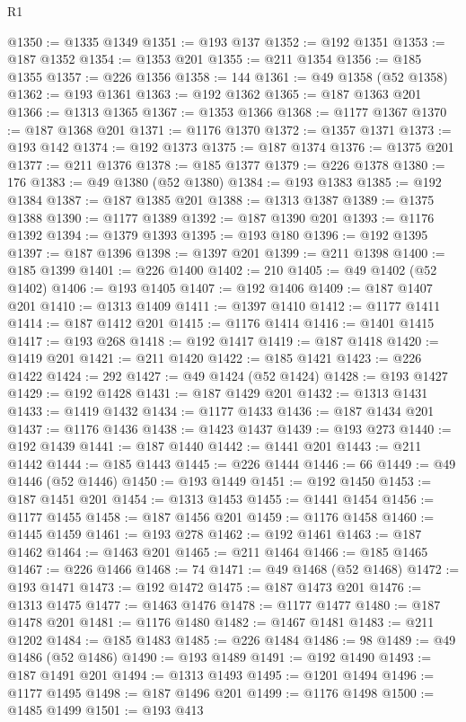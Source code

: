 \begin{lexlean}{R1}
\begin{coremodule}
@1350 := @1335 @1349
@1351 := @193 @137
@1352 := @192 @1351
@1353 := @187 @1352
@1354 := @1353 @201
@1355 := @211 @1354
@1356 := @185 @1355
@1357 := @226 @1356
@1358 := 144
@1361 := @49 @1358 (@52 @1358)
@1362 := @193 @1361
@1363 := @192 @1362
@1365 := @187 @1363 @201
@1366 := @1313 @1365
@1367 := @1353 @1366
@1368 := @1177 @1367
@1370 := @187 @1368 @201
@1371 := @1176 @1370
@1372 := @1357 @1371
@1373 := @193 @142
@1374 := @192 @1373
@1375 := @187 @1374
@1376 := @1375 @201
@1377 := @211 @1376
@1378 := @185 @1377
@1379 := @226 @1378
@1380 := 176
@1383 := @49 @1380 (@52 @1380)
@1384 := @193 @1383
@1385 := @192 @1384
@1387 := @187 @1385 @201
@1388 := @1313 @1387
@1389 := @1375 @1388
@1390 := @1177 @1389
@1392 := @187 @1390 @201
@1393 := @1176 @1392
@1394 := @1379 @1393
@1395 := @193 @180
@1396 := @192 @1395
@1397 := @187 @1396
@1398 := @1397 @201
@1399 := @211 @1398
@1400 := @185 @1399
@1401 := @226 @1400
@1402 := 210
@1405 := @49 @1402 (@52 @1402)
@1406 := @193 @1405
@1407 := @192 @1406
@1409 := @187 @1407 @201
@1410 := @1313 @1409
@1411 := @1397 @1410
@1412 := @1177 @1411
@1414 := @187 @1412 @201
@1415 := @1176 @1414
@1416 := @1401 @1415
@1417 := @193 @268
@1418 := @192 @1417
@1419 := @187 @1418
@1420 := @1419 @201
@1421 := @211 @1420
@1422 := @185 @1421
@1423 := @226 @1422
@1424 := 292
@1427 := @49 @1424 (@52 @1424)
@1428 := @193 @1427
@1429 := @192 @1428
@1431 := @187 @1429 @201
@1432 := @1313 @1431
@1433 := @1419 @1432
@1434 := @1177 @1433
@1436 := @187 @1434 @201
@1437 := @1176 @1436
@1438 := @1423 @1437
@1439 := @193 @273
@1440 := @192 @1439
@1441 := @187 @1440
@1442 := @1441 @201
@1443 := @211 @1442
@1444 := @185 @1443
@1445 := @226 @1444
@1446 := 66
@1449 := @49 @1446 (@52 @1446)
@1450 := @193 @1449
@1451 := @192 @1450
@1453 := @187 @1451 @201
@1454 := @1313 @1453
@1455 := @1441 @1454
@1456 := @1177 @1455
@1458 := @187 @1456 @201
@1459 := @1176 @1458
@1460 := @1445 @1459
@1461 := @193 @278
@1462 := @192 @1461
@1463 := @187 @1462
@1464 := @1463 @201
@1465 := @211 @1464
@1466 := @185 @1465
@1467 := @226 @1466
@1468 := 74
@1471 := @49 @1468 (@52 @1468)
@1472 := @193 @1471
@1473 := @192 @1472
@1475 := @187 @1473 @201
@1476 := @1313 @1475
@1477 := @1463 @1476
@1478 := @1177 @1477
@1480 := @187 @1478 @201
@1481 := @1176 @1480
@1482 := @1467 @1481
@1483 := @211 @1202
@1484 := @185 @1483
@1485 := @226 @1484
@1486 := 98
@1489 := @49 @1486 (@52 @1486)
@1490 := @193 @1489
@1491 := @192 @1490
@1493 := @187 @1491 @201
@1494 := @1313 @1493
@1495 := @1201 @1494
@1496 := @1177 @1495
@1498 := @187 @1496 @201
@1499 := @1176 @1498
@1500 := @1485 @1499
@1501 := @193 @413

\end{coremodule}
\end{lexlean}
